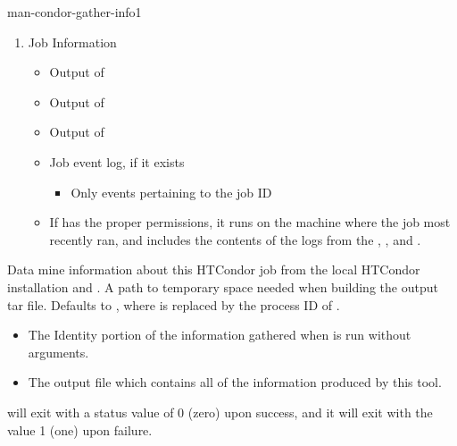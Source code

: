 \begin{ManPage}{}{man-condor-gather-info}{1}
\begin{enumerate}
\begin{itemize}
\begin{itemize}
		  \end{itemize}
	\end{itemize}
	\item Job Information
	\begin{itemize}
    	\item Output of 
    	\item Output of 
    	\item Output of 
    	\item Job event log, if it exists
		\begin{itemize}
          	\item Only events pertaining to the job ID 
		\end{itemize}
    	\item If  has the proper permissions,
it runs  on the machine where the job most recently ran,
and includes the contents of the logs from the ,
, and .
	\end{itemize}
\end{enumerate}

\begin{Options}
  {Data mine information about this HTCondor job from the local 
  HTCondor installation and .}
  {A path to temporary space needed when building the output tar file.
  Defaults to , where  is replaced by
  the process ID of .}
\end{Options}

\Files

\begin{itemize}
  \item{} The Identity portion of the information 
  gathered when  is run without arguments.

  \item{} The output file which contains all of 
  the information produced by this tool.
\end{itemize}

\ExitStatus

 will exit with a status value of 0 (zero) upon success,
and it will exit with the value 1 (one) upon failure.

\end{ManPage}
